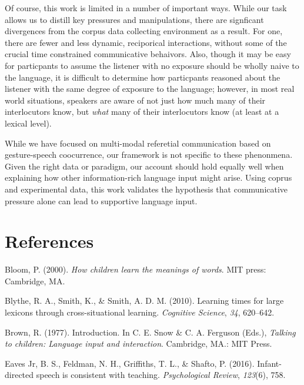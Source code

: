 \documentclass[10pt, letterpaper]{article}
\begin{document}
Of course, this work is limited in a number of important ways. While our
task allows us to distill key pressures and manipulations, there are
signficant divergences from the corpus data collecting environment as a
result. For one, there are fewer and less dynamic, reciporical
interactions, without some of the crucial time constrained communicative
behaivors. Also, though it may be easy for particpants to assume the
listener with no exposure should be wholly naive to the language, it is
difficult to determine how particpants reasoned about the listener with
the same degree of exposure to the language; however, in most real world
situations, speakers are aware of not just how much many of their
interlocutors know, but \emph{what} many of their interlocutors know (at
least at a lexical level).

While we have focused on multi-modal referetial communication based on
gesture-speech coocurrence, our framework is not specific to these
phenonmena. Given the right data or paradigm, our account should hold
equally well when explaining how other information-rich language input
might arise. Using coprus and experimental data, this work validates the
hypothesis that communicative pressure alone can lead to supportive
language input.

\section{References}\label{references}

\setlength{\parindent}{-0.1in} \setlength{\leftskip}{0.125in}

\noindent

\hypertarget{refs}{}
\hypertarget{ref-bloom2000}{}
Bloom, P. (2000). \emph{How children learn the meanings of words}. MIT
press: Cambridge, MA.

\hypertarget{ref-blythe2010}{}
Blythe, R. A., Smith, K., \& Smith, A. D. M. (2010). Learning times for
large lexicons through cross-situational learning. \emph{Cognitive
Science}, \emph{34}, 620--642.

\hypertarget{ref-brown1977}{}
Brown, R. (1977). Introduction. In C. E. Snow \& C. A. Ferguson (Eds.),
\emph{Talking to children: Language input and interaction}. Cambridge,
MA.: MIT Press.

\hypertarget{ref-eaves-jr2016}{}
Eaves Jr, B. S., Feldman, N. H., Griffiths, T. L., \& Shafto, P. (2016).
Infant-directed speech is consistent with teaching. \emph{Psychological
Review}, \emph{123}(6), 758.
\end{document}
